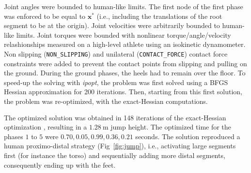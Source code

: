 Joint angles were bounded to human-like limits.
The first node of the first phase was enforced to be equal to $\mathbf{x^*}$ (i.e., including the translations of the root segment to be at the origin). 
Joint velocities were arbitrarily bounded to human-like limits.
Joint torques were bounded with nonlinear torque/angle/velocity relashionships measured on a high-level athlete using an isokinetic dynamometer. 
Non slipping (\texttt{NON\_SLIPPING}) and unilateral (\texttt{CONTACT\_FORCE}) contact force constraints were added to prevent the contact points from slipping and pulling on the ground.
During the ground phases, the heels had to remain over the floor.
To speed-up the solving with \emph{ipopt}, the problem was first solved using a BFGS Hessian approximation for 200 iterations.
Then, starting from this first solution, the problem was re-optimized, with the exact-Hessian computations.

The optimized solution was obtained in 148 iterations of the exact-Hessian optimization , resulting in a $\SI{1.28}{\meter}$ jump height.
The optimized time for the phases $1$ to $5$ were $0.70, 0.05, 0.99, 0.36, 0.21$ seconds.
The solution reproduced a human proximo-distal strategy (Fig~\ref{fig:jump}), i.e., activating large segments first (for instance the torso) and sequentially adding more distal segments, consequently ending up with the feet.
